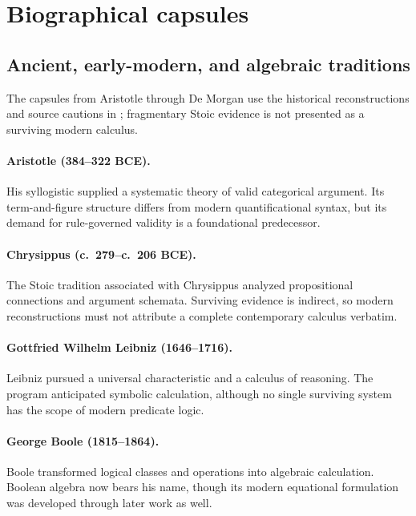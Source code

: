\section{Biographical capsules}
\label{sec:p13-biographies}

\subsection*{Ancient, early-modern, and algebraic traditions}
The capsules from Aristotle through De Morgan use the historical
reconstructions and source cautions in \cite{KnealeKneale1962}; fragmentary
Stoic evidence is not presented as a surviving modern calculus.

\paragraph{Aristotle (384--322 BCE).}
His syllogistic supplied a systematic theory of valid categorical argument.
Its term-and-figure structure differs from modern quantificational syntax, but
its demand for rule-governed validity is a foundational predecessor.

\paragraph{Chrysippus (c.~279--c.~206 BCE).}
The Stoic tradition associated with Chrysippus analyzed propositional
connections and argument schemata. Surviving evidence is indirect, so modern
reconstructions must not attribute a complete contemporary calculus verbatim.

\paragraph{Gottfried Wilhelm Leibniz (1646--1716).}
Leibniz pursued a universal characteristic and a calculus of reasoning. The
program anticipated symbolic calculation, although no single surviving system
has the scope of modern predicate logic.

\paragraph{George Boole (1815--1864).}
Boole transformed logical classes and operations into algebraic calculation.
Boolean algebra now bears his name, though its modern equational formulation
was developed through later work as well.

